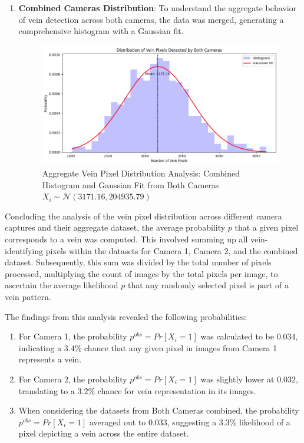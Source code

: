 \begin{enumerate}
    \newpage
    \item \textbf{Combined Cameras Distribution}: To understand the aggregate behavior of vein detection across both cameras, the data was merged, generating a comprehensive histogram with a Gaussian fit.

    \begin{figure}[H]
        \centering
        \includegraphics[width=1\linewidth]{latex-img/distribution_veins_bothcams.png}
        \caption{Aggregate Vein Pixel Distribution Analysis: Combined Histogram and Gaussian Fit from Both Cameras \(X_i \sim \mathcal{N}(3171.16, 204935.79)\)}
        \label{distribution_veins_bothcams}
    \end{figure}

\end{enumerate}

Concluding the analysis of the vein pixel distribution across different camera captures and their aggregate dataset, the average probability \(p\) that a given pixel corresponds to a vein was computed. This involved summing up all vein-identifying pixels within the datasets for Camera 1, Camera 2, and the combined dataset. Subsequently, this sum was divided by the total number of pixels processed, multiplying the count of images by the total pixels per image, to ascertain the average likelihood \(p\) that any randomly selected pixel is part of a vein pattern.

The findings from this analysis revealed the following probabilities:
\begin{enumerate}
    \item For Camera 1, the probability \(p^{obs} = Pr[X_i = 1]\) was calculated to be \(0.034\), indicating a \(3.4\)\% chance that any given pixel in images from Camera 1 represents a vein.

    \item For Camera 2, the probability \(p^{obs} = Pr[X_i = 1]\) was slightly lower at \(0.032\), translating to a \(3.2\)\% chance for vein representation in its images.

    \item When considering the datasets from Both Cameras combined, the probability \(p^{obs} = Pr[X_i = 1]\) averaged out to \(0.033\), suggesting a \(3.3\)\% likelihood of a pixel depicting a vein across the entire dataset. 
    
\end{enumerate}

